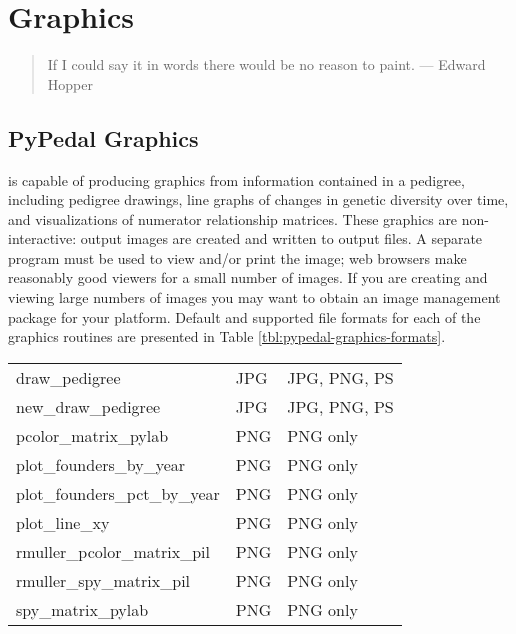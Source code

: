 \chapter{Graphics}
\label{cha:graphics}
\begin{quote}
If I could say it in words there would be no reason to paint. --- Edward Hopper
\end{quote}
\section{PyPedal Graphics}
\label{sec:graphics-overview}
\PyPedal{} is capable of producing graphics from information contained in a pedigree, including pedigree drawings, line graphs of changes in genetic diversity over time, and visualizations of numerator relationship matrices.  These graphics are non-interactive: output images are created and written to output files.  A separate program must be used to view and/or print the image; web browsers make reasonably good viewers for a small number of images.  If you are creating and viewing large numbers of images you may want to obtain an image management package for your platform.  Default and supported file formats for each of the graphics routines are presented in Table \ref{tbl:pypedal-graphics-formats}.
\begin{center}
    \tablelasttail{\hline}
    \label{tbl:pypedal-graphics-formats}
    \begin{xtabular}{llp{2in}}
	draw\_pedigree & JPG & JPG, PNG, PS \\
	new\_draw\_pedigree & JPG & JPG, PNG, PS \\
	pcolor\_matrix\_pylab & PNG & PNG only \\
	plot\_founders\_by\_year & PNG & PNG only \\
	plot\_founders\_pct\_by\_year & PNG & PNG only \\
	plot\_line\_xy & PNG & PNG only \\
	rmuller\_pcolor\_matrix\_pil & PNG & PNG only \\
	rmuller\_spy\_matrix\_pil & PNG & PNG only \\
	spy\_matrix\_pylab & PNG & PNG only \\
    \end{xtabular}
\end{center}
